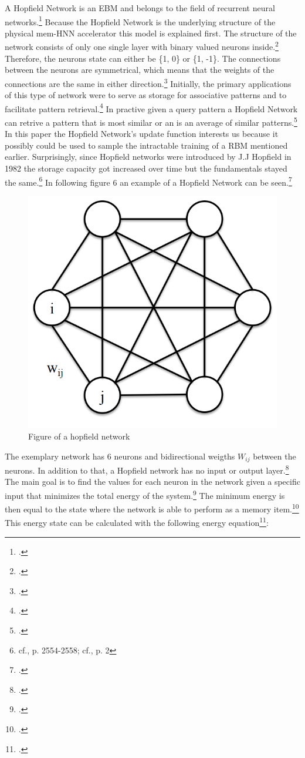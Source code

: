 A Hopfield Network is an \ac{EBM} and belongs to the field of recurrent neural networks.\footcite[cf.][35]{dramschChapterOne702020}
Because the Hopfield Network is the underlying structure of the physical \ac{mem-HNN} accelerator this model is explained first.
The structure of the network consists of only one single layer with binary valued neurons inside.\footcite[cf.][7]{ahadNeuralNetworksWireless2016}
Therefore, the neurons state can either be \{1, 0\} or \{1, -1\}.
The connections between the neurons are symmetrical, which means that the weights of the connections are the same in either direction.\footcite[cf.][7]{ahadNeuralNetworksWireless2016}
Initially, the primary applications of this type of network were to serve as storage for associative patterns and to facilitate pattern retrieval.\footcite[cf.][2]{ramsauerHopfieldNetworksAll2021}
In practive given a query pattern a Hopfield Network can retrive a pattern that is most similar or an is an average of similar patterns.\footcite[cf.][2]{ramsauerHopfieldNetworksAll2021}
In this paper the Hopfield Network's update function interests us because it possibly could be used to sample the intractable training of a \ac{RBM} mentioned earlier.
Surprisingly, since Hopfield networks were introduced by J.J Hopfield in 1982 the storage capacity got increased over time but the fundamentals stayed the same.\footnote{cf.\cite{hopfieldNeuralNetworksPhysical1982}, p. 2554-2558; cf.\cite{ramsauerHopfieldNetworksAll2021}, p. 2}
In following figure 6 an example of a Hopfield Network can be seen.\footcite[cf.][1-2]{yaoMassivelyParallelAssociative2013}

\begin{figure}[H]
    \centering
    \includegraphics[width=0.3\linewidth]{graphics/Hopfield_Netzwerk.png}
    \caption{Figure of a hopfield network}
\end{figure}
The exemplary network has 6 neurons and bidirectional weigths \( W_{ij} \) between the neurons. 
In addition to that, a Hopfield network has no input or output layer.\footcite[cf.][3]{yaoMassivelyParallelAssociative2013}
The main goal is to find the values for each neuron in the network given a specific input that minimizes the total energy of the system.\footcite[cf.][7]{ahadNeuralNetworksWireless2016}
The minimum energy is then equal to the state where the network is able to perform as a memory item.\footcite[cf.][7]{ahadNeuralNetworksWireless2016}
This energy state can be calculated with the following energy equation\footcite[cf.][2556]{hopfieldNeuralNetworksPhysical1982}: 

